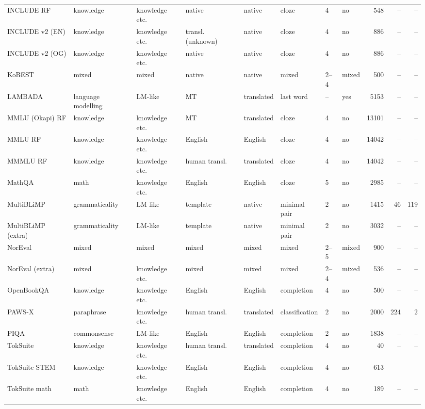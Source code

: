 \begin{tabular}{llllllllrrr}
INCLUDE RF & knowledge & knowledge etc. & native & native & cloze & 4 & no & 548 & -- & -- \\
INCLUDE v2 (EN) & knowledge & knowledge etc. & transl. (unknown) & native & cloze & 4 & no & 886 & -- & -- \\
INCLUDE v2 (OG) & knowledge & knowledge etc. & native & native & cloze & 4 & no & 886 & -- & -- \\
KoBEST & mixed & mixed & native & native & mixed & 2--4 & mixed & 500 & -- & -- \\
LAMBADA & language modelling & LM-like & MT & translated & last word & -- & yes & 5153 & -- & -- \\
MMLU (Okapi) RF & knowledge & knowledge etc. & MT & translated & cloze & 4 & no & 13101 & -- & -- \\
MMLU RF & knowledge & knowledge etc. & English & English & cloze & 4 & no & 14042 & -- & -- \\
MMMLU RF & knowledge & knowledge etc. & human transl. & translated & cloze & 4 & no & 14042 & -- & -- \\
MathQA & math & knowledge etc. & English & English & cloze & 5 & no & 2985 & -- & -- \\
MultiBLiMP & grammaticality & LM-like & template & native & minimal pair & 2 & no & 1415 & 46 & 119 \\
MultiBLiMP (extra) & grammaticality & LM-like & template & native & minimal pair & 2 & no & 3032 & -- & -- \\
NorEval & mixed & mixed & mixed & mixed & mixed & 2--5 & mixed & 900 & -- & -- \\
NorEval (extra) & mixed & knowledge etc. & mixed & mixed & mixed & 2--4 & mixed & 536 & -- & -- \\
OpenBookQA & knowledge & knowledge etc. & English & English & completion & 4 & no & 500 & -- & -- \\
PAWS-X & paraphrase & knowledge etc. & human transl. & translated & classification & 2 & no & 2000 & 224 & 2 \\
PIQA & commonsense & LM-like & English & English & completion & 2 & no & 1838 & -- & -- \\
TokSuite & knowledge & knowledge etc. & human transl. & translated & completion & 4 & no & 40 & -- & -- \\
TokSuite STEM & knowledge & knowledge etc. & English & English & completion & 4 & no & 613 & -- & -- \\
TokSuite math & math & knowledge etc. & English & English & completion & 4 & no & 189 & -- & -- \\

\end{tabular}

